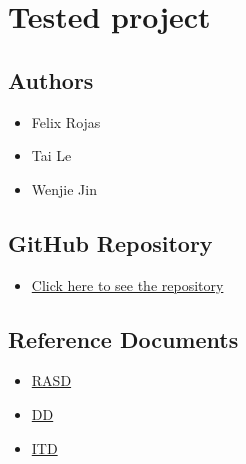 \chapter{Tested project}

\section*{Authors}
\begin{itemize}
    \item Felix Rojas
    \item Tai Le
    \item Wenjie Jin
\end{itemize}

\section*{GitHub Repository}
\begin{itemize}
    \item \href{https://github.com/felixsrp}{Click here to see the repository}
\end{itemize}

\section*{Reference Documents}
\begin{itemize}
    \item \href{https://github.com/felixsrp/RojasJinLe/blob/main/DeliveryFolder/RASDv4.pdf}{RASD}
    \item \href{https://github.com/felixsrp/RojasJinLe/blob/main/DeliveryFolder/DDv3.pdf}{DD}
    \item \href{https://github.com/felixsrp/RojasJinLe/blob/main/DeliveryFolder/ITDv1.pdf}{ITD}
\end{itemize}